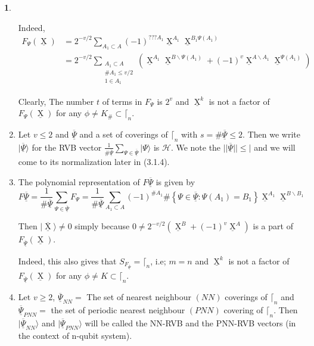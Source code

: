 \documentclass[a4paper,12pt]{article}
\DeclareMathOperator{\x}{\mathrm{X}}
\theoremstyle{definition}
\theoremstyle{underlinethm}
\theoremstyle{underline}
\newtheorem{subsubsec}{}[subsection]
\begin{document}
\begin{subsubsec}
\begin{enumerate}[label=(\alph*)]
Indeed, 
\begin{align*}
F_{\Psi}(\underline{\x}) &= 2^{-v/2} \sum_{A_{1} \subset A}(-1)^{??? A_{1}} \underline{\x}^{A_{1}} \underline{\x}^{B_{1}\Psi(A_{1})}\nonumber\\
& = 2^{-v/2} \sum_{\substack{A_{1} \subset A \\ \#A_{1} \leq v/2 \\ 1 \in A_{1}}} \left(\underline{\x}^{A_{1}} \underline{\x}^{B\smallsetminus \Psi (A_{1}) } + (-1)^{v} \underline{\x}^{A \smallsetminus A_{1}} \underline{\x}^{\Psi (A_{1})} \right)\tag{3.5}  
\end{align*}

Clearly, The number $t$ of terms in $F_{\Psi}$ is $2^{v}$ and $\underline{\x}^{k}$ is not a factor of $F_{\Psi}(\underline{\x})$ for any $\phi \neq K_{\#} \subset \lceil_{n}$.

\item Let $v \leq 2$ and $\underline{\overline{\Psi}}$ and  a set of coverings of $\lceil_{n}$ with $s= \# \underline{\overline{\Psi}} \leq 2$. Then we write $| \underline{\overline{\Psi}}\rangle$ for the RVB vector $\frac{1}{\# \underline{\overline{\Psi}}} \sum_{\Psi \in \underline{\overline{\Psi}}} | \Psi \rangle$ is $\mathcal{H}$. We note the $|| \underline{\overline{\Psi}} || \leq |$ and we will come to its normalization later in (3.1.4).

\item The polynomial representation of $F\underline{\overline{\Psi}}$ is given by
\begin{equation}
F\underline{\overline{\Psi}} = \frac{1}{\# \underline{\overline{\Psi}}} \sum_{\Psi \in \underline{\overline{\Psi}}} F_{\Psi} = \frac{1}{\# \underline{\overline{\Psi}}} \sum_{A_{1} \subset A} (-1)^{\# A_{1}} \# \left\{ \Psi \in \underline{\overline{\Psi}} : \Psi (A_{1}) = B_{1}\right\} \underline{\x}^{A_{1}} \underline{\x}^{B\smallsetminus B_{1}}\tag{3.6}\label{eq-3.6}
\end{equation}

Then $| \underline{\overline{\x}} \rangle \neq 0$ simply because $0 \neq 2^{-v/2}(\underline{\x}^{B} + (-1)^{v} \underline{\x}^{A})$ is a part of $F_{\underline{\overline{\Psi}}}(\underline{\x})$.

Indeed, this also gives that $S_{F_{\underline{\overline{\Psi}}}} = \lceil_{n}$, i.e; $m=n$ and $\underline{\x}^{k}$ is not a factor of $F_{\underline{\overline{\Psi}}} (\underline{\x})$ for any $\phi \neq K \subset \lceil_{n}$.

\item Let $v \geq 2 $, $\underline{\overline{\Psi}}_{NN} =$ The set of nearest neighbour $(NN)$ coverings of $\lceil_{n}$ and $\underline{\overline{\Psi}}_{PNN} =$ the set of periodic nearest neighbour $(PNN)$  covering of $\lceil_{n}$. Then $|\underline{\overline{\Psi}}_{NN} \rangle$ and $| \underline{\overline{\Psi}}_{PNN} \rangle$ will be called the NN-RVB and the PNN-RVB vectors (in the context of n-qubit system).


\end{enumerate}
\end{subsubsec}
\end{document}
